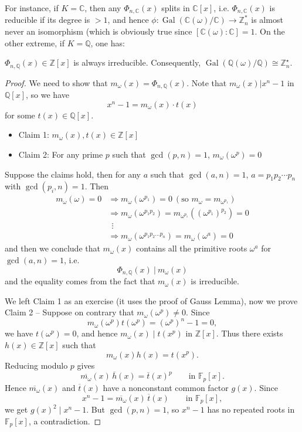 For instance, if $K = \mathbb{C}$, then any $\Phi_{n,\mathbb{C}}(x)$ splits in $\mathbb{C}[x]$, i.e. $\Phi_{n,\mathbb{C}}(x)$ is reducible if its degree is $> 1$, and hence $\phi: \operatorname{Gal}(\mathbb{C}(\omega)/\mathbb{C}) \to \mathbb{Z}_n^*$ is almost never an isomorphism (which is obviously true since $[\mathbb{C}(\omega):\mathbb{C}] = 1$. On the other extreme, if $K = \mathbb{Q}$, one has:
\begin{theorem}
    $\Phi_{n,\mathbb{Q}}(x)\in \mathbb{Z}[x]$ is always irreducible. Consequently, $\operatorname{Gal}(\mathbb{Q}(\omega)/\mathbb{Q}) \cong \mathbb{Z}_n^\star$.
\end{theorem}
\begin{proof}
    We need to show that $m_\omega(x)=\Phi_{n,\mathbb{Q}}(x)$. Note that $m_\omega(x)|x^n-1$ in $\mathbb{Q}[x]$, so we have 
    $$x^n-1=m_\omega(x) \cdot t(x)$$
    for some $t(x) \in \mathbb{Q}[x]$.
    \begin{itemize}
        \item Claim 1: $m_\omega(x), t(x) \in \mathbb{Z}[x]$
        \item Claim 2: For any prime $p$ such that $\operatorname{gcd}(p,n)=1$, $m_{\omega}(\omega^p)=0$
    \end{itemize}
    Suppose the claims hold, then for any $a$ such that $\operatorname{gcd}(a,n)=1$, $a=p_1p_2\cdots p_n$ with $\gcd(p_i,n) = 1$. Then 
    \begin{align*}
    m_\omega(\omega)=0 &\Rightarrow m_\omega(\omega^{p_1})=0\ (\text{so } m_{\omega} = m_{\omega^{p_1}}) \\ &\Rightarrow m_\omega(\omega^{p_1p_2})=m_{\omega^{p_1}}((\omega^{p_1})^{p_2})=0 \\ 
    &\ \ \vdots \\
    &\Rightarrow m_\omega(\omega^{p_1p_2\dots p_n}) = m_\omega(\omega^a)=0\end{align*}
    and then we conclude that $m_\omega(x) $ contains all the primitive roots $\omega^a$ for $\gcd(a,n) =1$, i.e.
    $$\Phi_{n,\mathbb{Q}}(x)\ |\ m_\omega(x)$$
    and the equality comes from the fact that $m_{\omega}(x)$ is irreducible.
    
    \medskip
    We left Claim 1 as an exercise (it uses the proof of Gauss Lemma), now we prove Claim 2 -- Suppose on contrary that $m_\omega(\omega^p)\neq 0$. Since
    \[
    m_\omega(\omega^p)t(\omega^p)=(\omega^p)^n-1=0,
    \]
    we have $t(\omega^p)=0$, and hence $m_\omega(x)\mid t(x^p)$ in $\mathbb{Z}[x]$. Thus there exists $h(x)\in\mathbb{Z}[x]$ such that
    \[
    m_\omega(x)h(x)=t(x^p).
    \]
    Reducing modulo $p$ gives
    \[
    \overline{m_\omega}(x)\,\overline{h}(x)=\overline{t}(x)^p
    \qquad\text{in }\mathbb{F}_p[x].
    \]
    Hence $\overline{m_\omega}(x)$ and $\overline{t}(x)$ have a nonconstant common factor $g(x)$. Since
    \[
    x^n-1=\overline{m_\omega}(x)\,\overline{t}(x)
    \qquad\text{in }\mathbb{F}_p[x],
    \]
    we get $g(x)^2\mid x^n-1$. But $\gcd(p,n)=1$, so $x^n-1$ has no repeated roots in $\mathbb{F}_p[x]$, a contradiction.
\end{proof}
